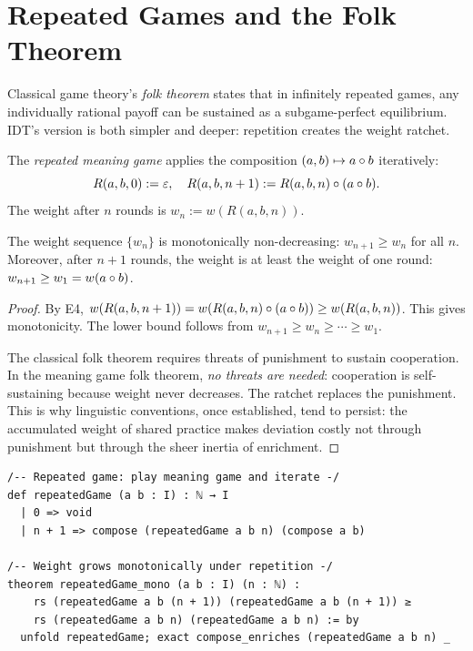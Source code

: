 \section{Repeated Games and the Folk Theorem}

Classical game theory's \emph{folk theorem} states that in infinitely
repeated games, any individually rational payoff can be sustained as a
subgame-perfect equilibrium. IDT's version is both simpler and deeper:
repetition creates the weight ratchet.

\begin{definition}
\label{def:repeated-game}
The \emph{repeated meaning game} applies the composition $(a, b) \mapsto
a \circ b$ iteratively:
\[
R(a, b, 0) := \varepsilon, \quad R(a, b, n+1) := R(a, b, n) \circ (a \circ b).
\]
The weight after $n$ rounds is $w_n := w(R(a, b, n))$.
\end{definition}

\begin{theorem}
\label{thm:folk-theorem}
The weight sequence $\{w_n\}$ is monotonically non-decreasing:
$w_{n+1} \geq w_n$ for all $n$.
Moreover, after $n+1$ rounds, the weight is at least the weight of one
round: $w_{n+1} \geq w_1 = w(a \circ b)$.
\end{theorem}

\begin{proof}
By E4, $w(R(a,b,n+1)) = w(R(a,b,n) \circ (a \circ b)) \geq w(R(a,b,n))$.
This gives monotonicity. The lower bound follows from
$w_{n+1} \geq w_n \geq \cdots \geq w_1$.

The classical folk theorem requires threats of punishment to sustain
cooperation. In the meaning game folk theorem, \emph{no threats are needed}:
cooperation is self-sustaining because weight never decreases. The ratchet
replaces the punishment. This is why linguistic conventions, once established,
tend to persist: the accumulated weight of shared practice makes deviation
costly not through punishment but through the sheer inertia of enrichment.
\end{proof}

\begin{lstlisting}[caption={Lean 4: Repeated game folk theorem}]
/-- Repeated game: play meaning game and iterate -/
def repeatedGame (a b : I) : ℕ → I
  | 0 => void
  | n + 1 => compose (repeatedGame a b n) (compose a b)

/-- Weight grows monotonically under repetition -/
theorem repeatedGame_mono (a b : I) (n : ℕ) :
    rs (repeatedGame a b (n + 1)) (repeatedGame a b (n + 1)) ≥
    rs (repeatedGame a b n) (repeatedGame a b n) := by
  unfold repeatedGame; exact compose_enriches (repeatedGame a b n) _
\end{lstlisting}

